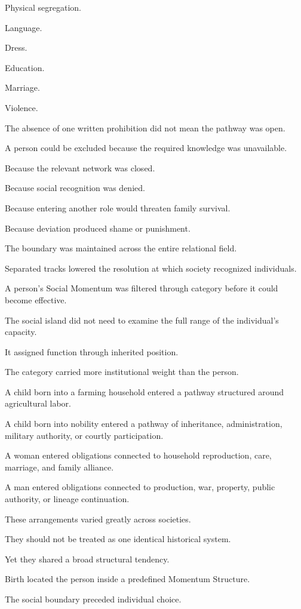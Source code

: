 Physical segregation.

Language.

Dress.

Education.

Marriage.

Violence.

The absence of one written prohibition did not mean the pathway was open.

A person could be excluded because the required knowledge was unavailable.

Because the relevant network was closed.

Because social recognition was denied.

Because entering another role would threaten family survival.

Because deviation produced shame or punishment.

The boundary was maintained across the entire relational field.

Separated tracks lowered the resolution at which society recognized individuals.

A person’s Social Momentum was filtered through category before it could become effective.

The social island did not need to examine the full range of the individual’s capacity.

It assigned function through inherited position.

The category carried more institutional weight than the person.

A child born into a farming household entered a pathway structured around agricultural labor.

A child born into nobility entered a pathway of inheritance, administration, military authority, or courtly participation.

A woman entered obligations connected to household reproduction, care, marriage, and family alliance.

A man entered obligations connected to production, war, property, public authority, or lineage continuation.

These arrangements varied greatly across societies.

They should not be treated as one identical historical system.

Yet they shared a broad structural tendency.

Birth located the person inside a predefined Momentum Structure.

The social boundary preceded individual choice.

